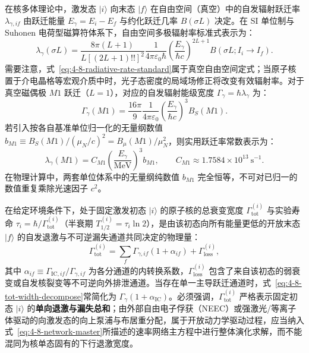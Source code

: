 在核多体理论中，激发态 $|i\rangle$ 向末态 $|f\rangle$ 在自由空间（真空）中的自发辐射跃迁率 $\lambda_{\gamma, if}$ 由跃迁能量 $E_\gamma = E_i - E_f$ 与约化跃迁几率 $B(\sigma L)$ 决定。在 SI 单位制与 Suhonen 电荷型磁算符体系下，自由空间多极辐射率标准式表示为：
\begin{equation}\label{eq:4-8-radiative-rate-standard}
\lambda_\gamma(\sigma L) = \frac{8\pi (L+1)}{L [(2L+1)!!]^2} \frac{1}{4\pi\varepsilon_0 \hbar} \left(\frac{E_\gamma}{\hbar c}\right)^{2L+1} B(\sigma L; I_i \to I_f).
\end{equation}
需要注意，式~\eqref{eq:4-8-radiative-rate-standard}属于真空自由空间定式；当原子核置于介电晶格等宏观介质中时，光子态密度的局域场修正将改变有效辐射率。对于真空磁偶极 $M1$ 跃迁（$L=1$），对应的自发辐射能级宽度 $\Gamma_\gamma = \hbar \lambda_\gamma$ 为：
\begin{equation}\label{eq:4-8-gamma-m1-width}
\Gamma_\gamma(M1) = \frac{16\pi}{9} \frac{1}{4\pi\varepsilon_0} \left(\frac{E_\gamma}{\hbar c}\right)^3 B_S(M1).
\end{equation}
若引入按各自基准单位归一化的无量纲数值 $b_{M1} \equiv B_S(M1) / (\mu_N/c)^2 = B_\mu(M1) / \mu_N^2$，则实用跃迁率常数表示为：
\begin{equation}\label{eq:4-8-m1-practical-rate}
\lambda_\gamma(M1) = C_{M1} \left(\frac{E_\gamma}{\mathrm{MeV}}\right)^3 b_{M1}, \qquad C_{M1} \approx 1.7584 \times 10^{13}\ \mathrm{s}^{-1}.
\end{equation}
在物理计算中，两套单位体系中的无量纲纯数值 $b_{M1}$ 完全恒等，不可对已归一的数值重复乘除光速因子 $c^2$。

在给定环境条件下，处于固定激发初态 $|i\rangle$ 的原子核的总衰变宽度 $\Gamma_{\mathrm{tot}}^{(i)}$ 与实验寿命 $\tau_i = \hbar / \Gamma_{\mathrm{tot}}^{(i)}$（半衰期 $T_{1/2}^{(i)} = \tau_i \ln 2$），是由该初态向所有能量更低的开放末态 $|f\rangle$ 的自发退激与不可逆漏失通道共同决定的物理量：
\begin{equation}\label{eq:4-8-tot-width-decompose}
\Gamma_{\mathrm{tot}}^{(i)} = \sum_{f} \Gamma_{\gamma, if} \left(1 + \alpha_{if}\right) + \Gamma_{\mathrm{loss}}^{(i)},
\end{equation}
其中 $\alpha_{if} \equiv \Gamma_{\mathrm{IC}, if} / \Gamma_{\gamma, if}$ 为各分通道的内转换系数，$\Gamma_{\mathrm{loss}}^{(i)}$ 包含了来自该初态的弱衰变或自发核裂变等不可逆向外排泄通道。当存在单一主导跃迁通道时，式~\eqref{eq:4-8-tot-width-decompose}常简化为 $\Gamma_\gamma(1 + \alpha_{\mathrm{IC}})$。必须强调，$\Gamma_{\mathrm{tot}}^{(i)}$ 严格表示固定初态 $|i\rangle$ 的\textbf{单向退激与漏失总和}；由外部自由电子俘获（NEEC）或强激光/等离子体驱动的向激发态的向上泵浦与布居重分配，属于开放动力学驱动过程，应当纳入式~\eqref{eq:4-8-network-master}所描述的速率网络主方程中进行整体演化求解，而不能混同为核单态固有的下行退激宽度。

